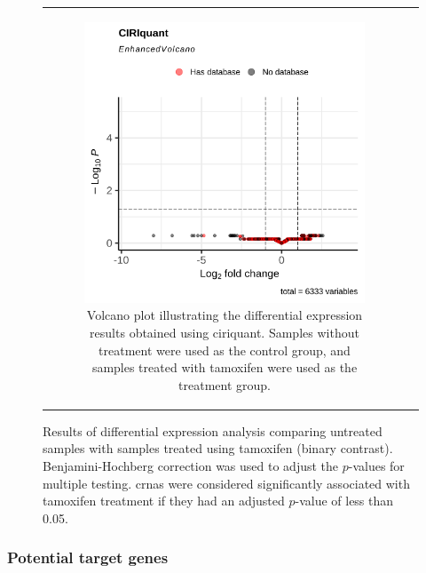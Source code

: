 \begin{figure}[H]
\begin{tabular}{cc}
\begin{subfigure}{0.5\textwidth}
            \includegraphics[width=\linewidth]{chapters/4_results_and_discussion/figures/dea/ciriquant/tamoxifen/volcano.png}
            \caption{Volcano plot illustrating the differential expression
                results obtained using \gls{ciriquant}.
                Samples without treatment were used as the control group, and samples treated
                with tamoxifen were used as the treatment group.
            }
            \label{fig:tamoxifen_volcano_ciriquant}
        \end{subfigure}

    \end{tabular}
    \caption{Results of differential expression analysis comparing untreated
        samples with samples treated using tamoxifen (binary contrast).
        Benjamini-Hochberg correction\supercite{benjamini_controlling_1995} was used to
        adjust the $p$-values for multiple testing.
        \Glspl{crna} were considered significantly associated with tamoxifen
        treatment if they had an adjusted $p$-value of less than 0.05.
    } \label{fig:tamoxifen_volcano} \end{figure}

\subsubsection{Potential target genes}

